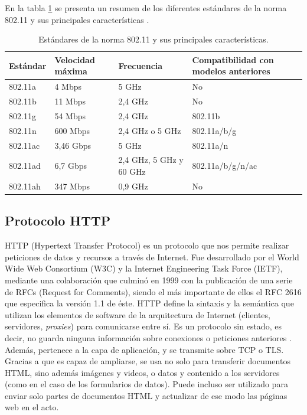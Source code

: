 En la tabla \ref{tab:protolocos80211} se presenta un resumen de los diferentes estándares de la norma 802.11 y sus principales características \citep{WEBSITE:80211}.

\begin{table}[h]
	\centering
	\caption[Protocolos 802.11]{Estándares de la norma 802.11 y sus principales características.}
	\begin{tabular}{p{2.5cm} p{3.5cm} p{3.5cm} p{3.5cm} } 	

		\toprule
		\textbf{Estándar} & 
		\textbf{Velocidad máxima} &
		\textbf{Frecuencia} &
		\textbf{Compatibilidad con modelos anteriores} 
		\\
		\midrule
802.11a & 4 Mbps & 5 GHz & No \\
802.11b & 11 Mbps & 2,4 GHz & No \\
802.11g & 54 Mbps & 2,4 GHz & 802.11b \\
802.11n & 600 Mbps & 2,4 GHz o 5 GHz & 802.11a/b/g \\
802.11ac & 3,46 Gbps & 5 GHz & 802.11a/n \\
802.11ad & 6,7 Gbps & 2,4 GHz, 5 GHz y 60 GHz & 802.11a/b/g/n/ac \\
802.11ah & 347 Mbps & 0,9 GHz & No \\
		\bottomrule
		\hline
	\end{tabular}
	\label{tab:protolocos80211}
\end{table}

\pagebreak
\subsection{Protocolo HTTP}

HTTP (Hypertext Transfer Protocol) es un protocolo que nos permite realizar peticiones de datos y recursos a través de Internet. Fue desarrollado por el World Wide Web Consortium (W3C) y la Internet Engineering Task Force (IETF), mediante una colaboración que culminó en 1999 con la publicación de una serie de RFCs (Request for Comments), siendo el más importante de ellos el RFC 2616 \citep{rfc2616} que especifica la versión 1.1 de éste. HTTP define la sintaxis y la semántica que utilizan los elementos de software de la arquitectura de Internet (clientes, servidores, \textit{proxies}) para comunicarse entre sí. Es un protocolo sin estado, es decir, no guarda ninguna información sobre conexiones o peticiones anteriores \citep{WEBSITE:HTTPWikipedia}. Además, pertenece a la capa de aplicación, y se transmite sobre TCP o TLS. Gracias a que es capaz de ampliarse, se usa no solo para transferir documentos HTML, sino además imágenes y videos, o datos y contenido a los servidores (como en el caso de los formularios de datos). Puede incluso ser utilizado para enviar solo partes de documentos HTML y actualizar de ese modo las páginas web en el acto.

